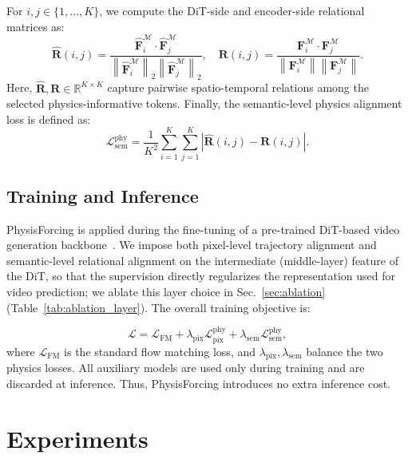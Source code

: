 \documentclass{llmxive}
\begin{document}
For $i,j\in\{1,\ldots,K\}$, we compute the DiT-side and encoder-side relational matrices as:
\begin{equation}
\hat{\mathbf{R}}(i,j)
=
\frac{
\hat{\mathbf{F}}^{\mathcal{M}}_{i}\cdot \hat{\mathbf{F}}^{\mathcal{M}}_{j}
}{
\left\|\hat{\mathbf{F}}^{\mathcal{M}}_{i}\right\|_2
\left\|\hat{\mathbf{F}}^{\mathcal{M}}_{j}\right\|_2
},
\quad
\mathbf{R}(i,j)
=
\frac{
\mathbf{F}^{\mathcal{M}}_{i}\cdot \mathbf{F}^{\mathcal{M}}_{j}
}{
\left\|\mathbf{F}^{\mathcal{M}}_{i}\right\|
\left\|\mathbf{F}^{\mathcal{M}}_{j}\right\|
}.
\end{equation}
Here, $\hat{\mathbf{R}},\mathbf{R}\in\mathbb{R}^{K\times K}$ capture pairwise spatio-temporal relations
among the selected physics-informative tokens. Finally, the semantic-level physics alignment loss is defined as:
\begin{equation}
\mathcal{L}^{\mathrm{phy}}_{\mathrm{sem}}
=
\frac{1}{K^2}
\sum_{i=1}^{K}
\sum_{j=1}^{K}
\left|
\hat{\mathbf{R}}(i,j)-\mathbf{R}(i,j)
\right|.
\end{equation}


\subsection{Training and Inference}

PhysisForcing is applied during the fine-tuning of a pre-trained DiT-based video generation
backbone~\cite{wan2025wan}. We impose both pixel-level trajectory alignment and semantic-level relational alignment on the
intermediate (middle-layer) feature of the DiT, so that the supervision directly regularizes the
representation used for video prediction; we ablate this layer choice in
Sec.~\ref{sec:ablation} (Table~\ref{tab:ablation_layer}). The overall training objective is:

\begin{equation}
\mathcal{L}
=
\mathcal{L}_{\mathrm{FM}}
+
\lambda_{\mathrm{pix}}\mathcal{L}^{\mathrm{phy}}_{\mathrm{pix}}
+
\lambda_{\mathrm{sem}}\mathcal{L}^{\mathrm{phy}}_{\mathrm{sem}},
\end{equation}
where $\mathcal{L}_{\mathrm{FM}}$ is the standard flow matching loss, and
$\lambda_{\mathrm{pix}},\lambda_{\mathrm{sem}}$ balance the two physics losses. All auxiliary models are used
only during training and are discarded at inference. Thus, PhysisForcing introduces no extra inference cost.
\section{Experiments}
\end{document}
